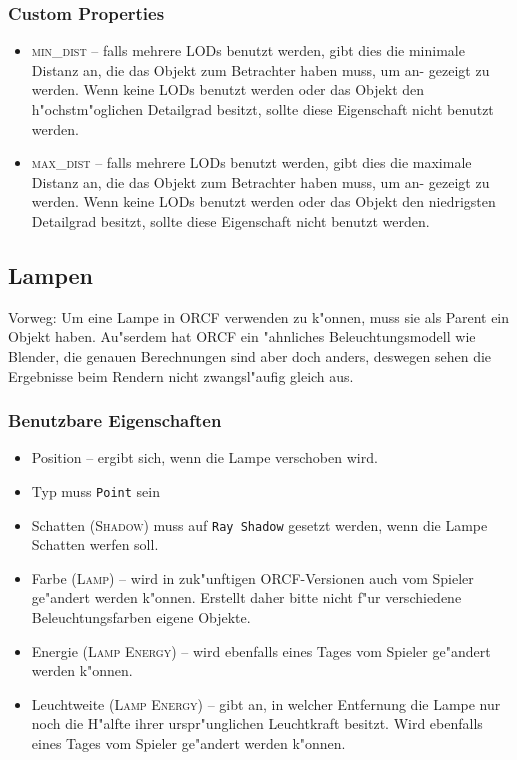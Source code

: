 \documentclass[a4paper]{article}
\newcommand{\ccaption}[1]{\textsc{#1}}
\newcommand{\cvalue}[1]{\texttt{#1}}
\newcommand{\rarrow}{\textrightarrow}
\begin{document}
\subsubsection{Custom Properties}
\begin{itemize}
\item \ccaption{min\_dist} -- falls mehrere LODs benutzt werden, gibt dies die minimale Distanz an, die das Objekt zum Betrachter haben muss, um an-
  gezeigt zu werden. Wenn keine LODs benutzt werden oder das Objekt den h"ochstm"oglichen Detailgrad besitzt, sollte diese Eigenschaft nicht benutzt
  werden.
\item \ccaption{max\_dist} -- falls mehrere LODs benutzt werden, gibt dies die maximale Distanz an, die das Objekt zum Betrachter haben muss, um an-
  gezeigt zu werden. Wenn keine LODs benutzt werden oder das Objekt den niedrigsten Detailgrad besitzt, sollte diese Eigenschaft nicht benutzt
  werden.
\end{itemize}

\subsection{Lampen}
Vorweg: Um eine Lampe in ORCF verwenden zu k"onnen, muss sie als Parent ein Objekt haben. Au"serdem hat ORCF ein "ahnliches Beleuchtungsmodell wie
Blender, die genauen Berechnungen sind aber doch anders, deswegen sehen die Ergebnisse beim Rendern nicht zwangsl"aufig gleich aus.

\subsubsection{Benutzbare Eigenschaften}
\begin{itemize}
\item Position -- ergibt sich, wenn die Lampe verschoben wird.
\item Typ muss \cvalue{Point} sein
\item Schatten (\ccaption{Shadow}) muss auf \cvalue{Ray Shadow} gesetzt werden, wenn die Lampe Schatten werfen soll.
\item Farbe (\ccaption{Lamp}) -- wird in zuk"unftigen ORCF-Versionen auch vom Spieler ge"andert werden k"onnen. Erstellt daher bitte nicht f"ur
  verschiedene Beleuchtungsfarben eigene Objekte.
\item Energie (\ccaption{Lamp \rarrow Energy}) -- wird ebenfalls eines Tages vom Spieler ge"andert werden k"onnen.
\item Leuchtweite (\ccaption{Lamp \rarrow Energy}) -- gibt an, in welcher Entfernung die Lampe nur noch die H"alfte ihrer urspr"unglichen Leuchtkraft
  besitzt. Wird ebenfalls eines Tages vom Spieler ge"andert werden k"onnen.
\end{itemize}
\end{document}
